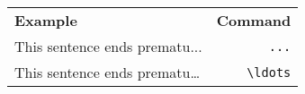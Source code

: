 \documentclass[varwidth,crop]{standalone}
\begin{document}
\begin{tabular}{lr}
    \textbf{Example} & \textbf{Command}\\
    This sentence ends prematu... & \verb|...|\\
    This sentence ends prematu\ldots & \verb|\ldots|\\
\end{tabular}
\end{document}
